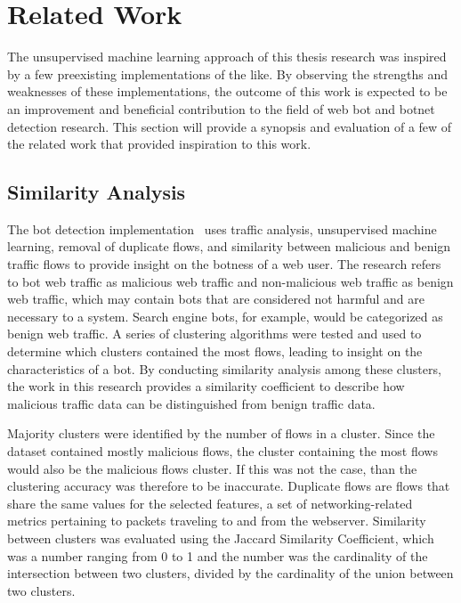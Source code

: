 
\chapter{Related Work}\label{ch:related-work}
The unsupervised machine learning approach of this thesis research was inspired by a few preexisting implementations of the like.
By observing the strengths and weaknesses of these implementations, the outcome of this work is expected to be an improvement and beneficial contribution to the field of web bot and botnet detection research.
This section will provide a synopsis and evaluation of a few of the related work that provided inspiration to this work.

\section{Similarity Analysis}\label{sec:similarity-analysis}
The bot detection implementation~\cite{bot_detection_wei_alvarez} uses traffic analysis, unsupervised machine learning, removal of duplicate flows, and similarity between malicious and benign traffic flows to provide insight on the botness of a web user.
The research refers to bot web traffic as malicious web traffic and non-malicious web traffic as benign web traffic, which may contain bots that are considered not harmful and are necessary to a system.
Search engine bots, for example, would be categorized as benign web traffic.
A series of clustering algorithms were tested and used to determine which clusters contained the most flows, leading to insight on the characteristics of a bot.
By conducting similarity analysis among these clusters, the work in this research provides a similarity coefficient to describe how malicious traffic data can be distinguished from benign traffic data.

Majority clusters were identified by the number of flows in a cluster.
Since the dataset contained mostly malicious flows, the cluster containing the most flows would also be the malicious flows cluster.
If this was not the case, than the clustering accuracy was therefore to be inaccurate.
Duplicate flows are flows that share the same values for the selected features, a set of networking-related metrics pertaining to packets traveling to and from the webserver.
Similarity between clusters was evaluated using the Jaccard Similarity Coefficient, which was a number ranging from 0 to 1 and the number was the cardinality of the intersection between two clusters, divided by the cardinality of the union between two clusters.

